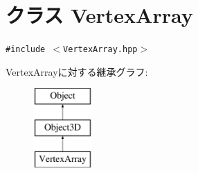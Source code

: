 \hypertarget{classm3g_1_1VertexArray}{
\section{クラス VertexArray}
\label{classm3g_1_1VertexArray}
}
{\tt \#include $<$VertexArray.hpp$>$}

VertexArrayに対する継承グラフ:\begin{figure}[H]
\begin{center}
\leavevmode
\includegraphics[height=3cm]{classm3g_1_1VertexArray}
\end{center}
\end{figure}
